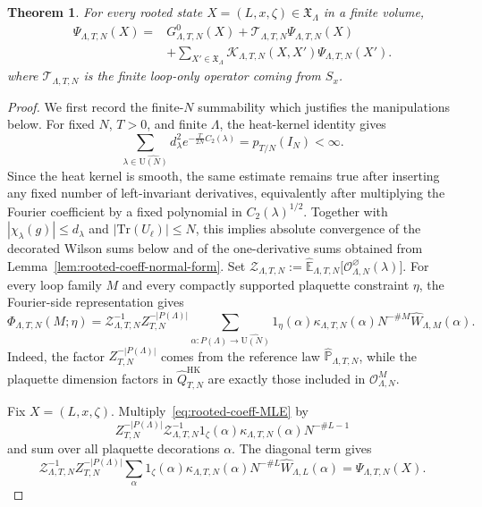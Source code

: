 \documentclass[11pt,a4paper,reqno]{amsart}
\newtheorem{theorem}{Theorem}[section]
\theoremstyle{definition}
\theoremstyle{remark}
\newcommand\U{{\mathrm U}}
\newcommand\E{{\mathbb E}}
\newcommand\Tr{{\mathrm{Tr}}}
\newcommand\HK{{\mathrm{HK}}}
\newcommand\Pbb{{\mathbb{P}}}
\begin{document}
\begin{theorem}\label{thm:raw-rooted-HK-equation}
For every rooted state $X=(L,x,\zeta)\in\mathfrak X_\Lambda$ in a finite volume,
\begin{equation}\label{eq:raw-rooted-HK-equation}
\begin{aligned}
\Psi_{\Lambda,T,N}(X)
={}&G^0_{\Lambda,T,N}(X)
+\mathcal T_{\Lambda,T,N}\Psi_{\Lambda,T,N}(X)\\
&+\sum_{X'\in\mathfrak X_\Lambda}
\mathcal K_{\Lambda,T,N}(X,X')
\Psi_{\Lambda,T,N}(X').
\end{aligned}
\end{equation}
where $\mathcal T_{\Lambda,T,N}$ is the finite loop-only operator coming from $S_x$.
\end{theorem}

\begin{proof}
We first record the finite-$N$ summability which justifies the manipulations below.  For fixed $N$, $T>0$, and finite $\Lambda$, the heat-kernel identity gives
\[
\sum_{\lambda\in\widehat{\U(N)}} d_\lambda^2e^{-\frac{T}{2N}C_2(\lambda)}=p_{T/N}(I_N)<\infty.
\]
Since the heat kernel is smooth, the same estimate remains true after inserting any fixed number of left-invariant derivatives, equivalently after multiplying the Fourier coefficient by a fixed polynomial in $C_2(\lambda)^{1/2}$.  Together with $|\chi_\lambda(g)|\le d_\lambda$ and $|\Tr(U_\ell)|\le N$, this implies absolute convergence of the decorated Wilson sums below and of the one-derivative sums obtained from Lemma~\ref{lem:rooted-coeff-normal-form}. Set $\mathcal Z_{\Lambda,T,N}:=\widehat\E_{\Lambda,T,N}\big[\mathcal O^\varnothing_{\Lambda,N}(\lambda)\big].$ For every loop family $M$ and every compactly supported plaquette constraint $\eta$, the Fourier-side representation gives
\[
\Phi_{\Lambda,T,N}(M;\eta)
=
\mathcal Z_{\Lambda,T,N}^{-1} Z_{T,N}^{-|P(\Lambda)|}
\sum_{\alpha:P(\Lambda)\to\widehat{\U(N)}}
1_\eta(\alpha) \kappa_{\Lambda,T,N}(\alpha)
N^{-\#M}\widehat W_{\Lambda,M}(\alpha).
\]
Indeed, the factor $Z_{T,N}^{-|P(\Lambda)|}$ comes from the reference law $\widehat\Pbb_{\Lambda,T,N}$, while the plaquette dimension factors in $\widehat Q^{\HK}_{T,N}$ are exactly those included in $\mathcal O^M_{\Lambda,N}$.

Fix $X=(L,x,\zeta)$.  Multiply~\eqref{eq:rooted-coeff-MLE} by
\[
Z_{T,N}^{-|P(\Lambda)|}\mathcal Z_{\Lambda,T,N}^{-1} 
1_\zeta(\alpha) \kappa_{\Lambda,T,N}(\alpha) N^{-\#L-1}
\]
and sum over all plaquette decorations $\alpha$.  The diagonal term gives
\[
\mathcal Z_{\Lambda,T,N}^{-1} Z_{T,N}^{-|P(\Lambda)|}
\sum_\alpha 1_\zeta(\alpha)\kappa_{\Lambda,T,N}(\alpha)
N^{-\#L}\widehat W_{\Lambda,L}(\alpha)
=
\Psi_{\Lambda,T,N}(X).
\]


\end{proof}
\end{document}
